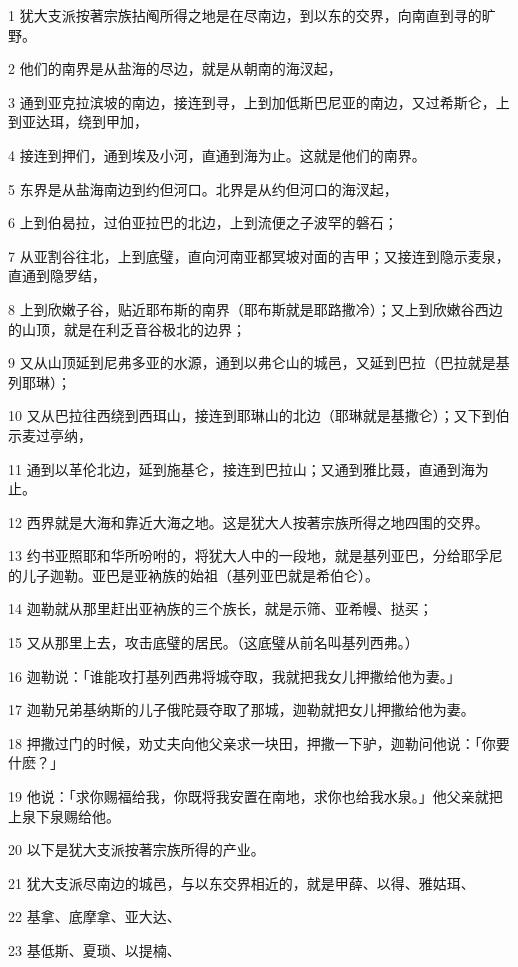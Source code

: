 \par 1 犹大支派按著宗族拈阄所得之地是在尽南边，到以东的交界，向南直到寻的旷野。
\par 2 他们的南界是从盐海的尽边，就是从朝南的海汊起，
\par 3 通到亚克拉滨坡的南边，接连到寻，上到加低斯巴尼亚的南边，又过希斯仑，上到亚达珥，绕到甲加，
\par 4 接连到押们，通到埃及小河，直通到海为止。这就是他们的南界。
\par 5 东界是从盐海南边到约但河口。北界是从约但河口的海汊起，
\par 6 上到伯曷拉，过伯亚拉巴的北边，上到流便之子波罕的磐石；
\par 7 从亚割谷往北，上到底璧，直向河南亚都冥坡对面的吉甲；又接连到隐示麦泉，直通到隐罗结，
\par 8 上到欣嫩子谷，贴近耶布斯的南界（耶布斯就是耶路撒冷）；又上到欣嫩谷西边的山顶，就是在利乏音谷极北的边界；
\par 9 又从山顶延到尼弗多亚的水源，通到以弗仑山的城邑，又延到巴拉（巴拉就是基列耶琳）；
\par 10 又从巴拉往西绕到西珥山，接连到耶琳山的北边（耶琳就是基撒仑）；又下到伯示麦过亭纳，
\par 11 通到以革伦北边，延到施基仑，接连到巴拉山；又通到雅比聂，直通到海为止。
\par 12 西界就是大海和靠近大海之地。这是犹大人按著宗族所得之地四围的交界。
\par 13 约书亚照耶和华所吩咐的，将犹大人中的一段地，就是基列亚巴，分给耶孚尼的儿子迦勒。亚巴是亚衲族的始祖（基列亚巴就是希伯仑）。
\par 14 迦勒就从那里赶出亚衲族的三个族长，就是示筛、亚希幔、挞买；
\par 15 又从那里上去，攻击底璧的居民。（这底璧从前名叫基列西弗。）
\par 16 迦勒说：「谁能攻打基列西弗将城夺取，我就把我女儿押撒给他为妻。」
\par 17 迦勒兄弟基纳斯的儿子俄陀聂夺取了那城，迦勒就把女儿押撒给他为妻。
\par 18 押撒过门的时候，劝丈夫向他父亲求一块田，押撒一下驴，迦勒问他说：「你要什麽？」
\par 19 他说：「求你赐福给我，你既将我安置在南地，求你也给我水泉。」他父亲就把上泉下泉赐给他。
\par 20 以下是犹大支派按著宗族所得的产业。
\par 21 犹大支派尽南边的城邑，与以东交界相近的，就是甲薛、以得、雅姑珥、
\par 22 基拿、底摩拿、亚大达、
\par 23 基低斯、夏琐、以提楠、
